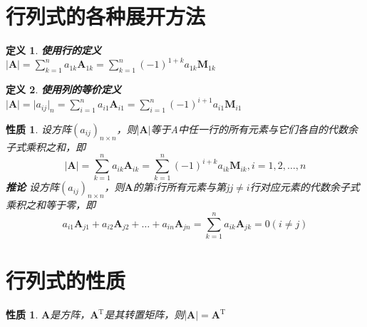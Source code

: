 \documentclass[a4paper]{ctexbook}
\newtheorem{definition}{定义}[section]
\newtheorem{property}[section]{性质}
\begin{document}
\section{行列式的各种展开方法}
\begin{definition}
    \textbf{使用行的定义}
    \\ \(\rvert\mathbf{A}\rvert=\sum\limits_{k=1}^n a_{1k}\mathbf{A}_{1k}=\sum\limits_{k=1}^n (-1)^{1+k}a_{1k}\mathbf{M}_{1k}\)
\end{definition}
\begin{definition}
    \textbf{使用列的等价定义}
    \\ \(\rvert\mathbf{A}\rvert=\rvert{a_{ij}}\rvert_n=\sum\limits_{i=1}^n a_{i1}\mathbf{A}_{i1}=\sum\limits_{i=1}^n (-1)^{i+1}a_{i1}\mathbf{M}_{i1}\)
\end{definition}
\begin{property}
    设方阵\((a_{ij})_{n \times n}\)，则\(\rvert \mathbf{A} \rvert\)等于A中任一行的所有元素与它们各自的代数余子式乘积之和，即
    \[\rvert\mathbf{A}\rvert=\sum\limits_{k=1}^n a_{ik}\mathbf{A}_{ik}=\sum\limits_{k=1}^n (-1)^{i+k}a_{ik}\mathbf{M}_{ik},
    i=1,2,\dots ,n\]
    \textbf{推论}
    设方阵\((a_{ij})_{n \times n}\)，则\(\mathbf{A}\)的第i行所有元素与第j\(j\neq i\)行对应元素的代数余子式乘积之和等于零，即
    \[a_{i1}\mathbf{A}_{j1}+a_{i2}\mathbf{A}_{j2}+ \dots + a_{in}\mathbf{A}_{jn}=\sum\limits_{k=1}^n a_{ik}\mathbf{A}_{jk}=0(i\neq j)\]
\end{property}

\section{行列式的性质}
\begin{property}
    \(\mathbf{A}\)是方阵，\(\mathbf{A}^{\mathrm{T}}\)是其转置矩阵，则\(\rvert \mathbf{A}\rvert=\mathbf{A}^{\mathrm{T}}\)
\end{property}
\end{document}
